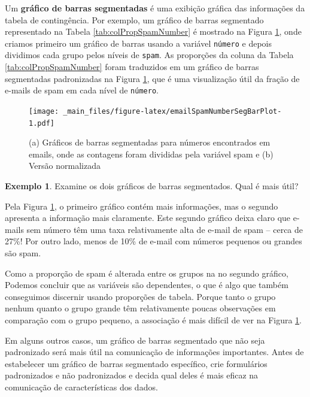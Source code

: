\documentclass[
]{book}
\theoremstyle{definition}
\theoremstyle{definition}
\newtheorem{example}{Exemplo}[chapter]
\theoremstyle{definition}
\theoremstyle{definition}
\theoremstyle{remark}
\begin{document}
Um \textbf{gráfico de barras segmentadas} é uma exibição gráfica das informações da tabela de contingência. Por exemplo, um gráfico de barras segmentado representado na Tabela \ref{tab:colPropSpamNumber} é mostrado na Figura \ref{fig:emailSpamNumberSegBarPlot}, onde criamos primeiro um gráfico de barras usando a variável \texttt{número} e depois dividimos cada grupo pelos níveis de \texttt{spam}. As proporções da coluna da Tabela \ref{tab:colPropSpamNumber} foram traduzidos em um gráfico de barras segmentadas padronizadas na Figura \ref{fig:emailSpamNumberSegBarPlot}, que é uma visualização útil da fração de e-mails de spam em cada nível de \texttt{número}.

\begin{figure}
\centering
\texttt{[image: \_main\_files/figure-latex/emailSpamNumberSegBarPlot-1.pdf]}
\caption{\label{fig:emailSpamNumberSegBarPlot}(a) Gráficos de barras segmentadas para números encontrados em emails, onde as contagens foram divididas pela variável spam e (b) Versão normalizada}
\end{figure}

\begin{example}
\protect\hypertarget{exm:unnamed-chunk-38}{}{\label{exm:unnamed-chunk-38} }Examine os dois gráficos de barras segmentados. Qual é mais útil?
\end{example}

Pela Figura \ref{fig:emailSpamNumberSegBarPlot}, o primeiro gráfico contém mais informações, mas o segundo apresenta a informação mais claramente. Este segundo gráfico deixa claro que e-mails sem número têm uma taxa relativamente alta de e-mail de spam -- cerca de 27\%! Por outro lado, menos de 10\% de e-mail com números pequenos ou grandes são spam.

Como a proporção de spam é alterada entre os grupos na no segundo gráfico, Podemos concluir que as variáveis são dependentes, o que é algo que também conseguimos discernir usando proporções de tabela. Porque tanto o grupo nenhum quanto o grupo grande têm relativamente poucas observações em comparação com o grupo pequeno, a associação é mais difícil de ver na Figura \ref{fig:emailSpamNumberSegBarPlot}.

Em alguns outros casos, um gráfico de barras segmentado que não seja padronizado será mais útil na comunicação de informações importantes. Antes de estabelecer um gráfico de barras segmentado específico, crie formulários padronizados e não padronizados e decida qual deles é mais eficaz na comunicação de características dos dados.
\end{document}
